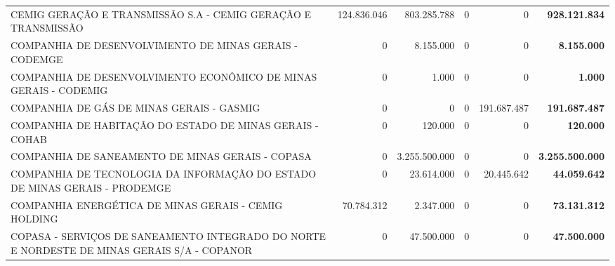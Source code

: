 \documentclass{article}
\begin{document}
\begin{longtable}[c]{m{5cm}|m{2.5cm}|m{2.5cm}|m{2.5cm}|m{2cm}|m{2cm}}
\multicolumn{1}{L{5cm}|}{CEMIG GERAÇÃO E TRANSMISSÃO S.A - CEMIG GERAÇÃO E TRANSMISSÃO} & \multicolumn{1}{r|}{124.836.046} & \multicolumn{1}{r|}{803.285.788} & \multicolumn{1}{r|}{0} & \multicolumn{1}{r|}{            0} & \multicolumn{1}{r}{ \textbf{928.121.834}} \\
\multicolumn{1}{L{5cm}|}{COMPANHIA DE DESENVOLVIMENTO DE MINAS GERAIS - CODEMGE} & \multicolumn{1}{r|}{          0} & \multicolumn{1}{r|}{8.155.000} & \multicolumn{1}{r|}{0} & \multicolumn{1}{r|}{            0} & \multicolumn{1}{r}{ \textbf{8.155.000}} \\
\multicolumn{1}{L{5cm}|}{COMPANHIA DE DESENVOLVIMENTO ECONÔMICO DE MINAS GERAIS - CODEMIG} & \multicolumn{1}{r|}{          0} & \multicolumn{1}{r|}{1.000} & \multicolumn{1}{r|}{0} & \multicolumn{1}{r|}{            0} & \multicolumn{1}{r}{ \textbf{1.000}} \\
\multicolumn{1}{L{5cm}|}{COMPANHIA DE GÁS DE MINAS GERAIS - GASMIG} & \multicolumn{1}{r|}{          0} & \multicolumn{1}{r|}{            0} & \multicolumn{1}{r|}{0} & \multicolumn{1}{r|}{191.687.487} & \multicolumn{1}{r}{ \textbf{191.687.487}} \\
\multicolumn{1}{L{5cm}|}{COMPANHIA DE HABITAÇÃO DO ESTADO DE MINAS GERAIS - COHAB} & \multicolumn{1}{r|}{          0} & \multicolumn{1}{r|}{120.000} & \multicolumn{1}{r|}{0} & \multicolumn{1}{r|}{            0} & \multicolumn{1}{r}{ \textbf{120.000}} \\
\multicolumn{1}{L{5cm}|}{COMPANHIA DE SANEAMENTO DE MINAS GERAIS - COPASA} & \multicolumn{1}{r|}{          0} & \multicolumn{1}{r|}{3.255.500.000} & \multicolumn{1}{r|}{0} & \multicolumn{1}{r|}{            0} & \multicolumn{1}{r}{ \textbf{3.255.500.000}} \\
\multicolumn{1}{L{5cm}|}{COMPANHIA DE TECNOLOGIA DA INFORMAÇÃO DO ESTADO DE MINAS GERAIS - PRODEMGE} & \multicolumn{1}{r|}{          0} & \multicolumn{1}{r|}{23.614.000} & \multicolumn{1}{r|}{0} & \multicolumn{1}{r|}{20.445.642} & \multicolumn{1}{r}{ \textbf{44.059.642}} \\
\multicolumn{1}{L{5cm}|}{COMPANHIA ENERGÉTICA DE MINAS GERAIS - CEMIG HOLDING} & \multicolumn{1}{r|}{70.784.312} & \multicolumn{1}{r|}{2.347.000} & \multicolumn{1}{r|}{0} & \multicolumn{1}{r|}{            0} & \multicolumn{1}{r}{ \textbf{73.131.312}} \\
\multicolumn{1}{L{5cm}|}{COPASA - SERVIÇOS DE SANEAMENTO INTEGRADO DO NORTE E NORDESTE DE MINAS GERAIS S/A - COPANOR} & \multicolumn{1}{r|}{          0} & \multicolumn{1}{r|}{47.500.000} & \multicolumn{1}{r|}{0} & \multicolumn{1}{r|}{            0} & \multicolumn{1}{r}{ \textbf{47.500.000}} \\

\end{longtable}
\end{document}
